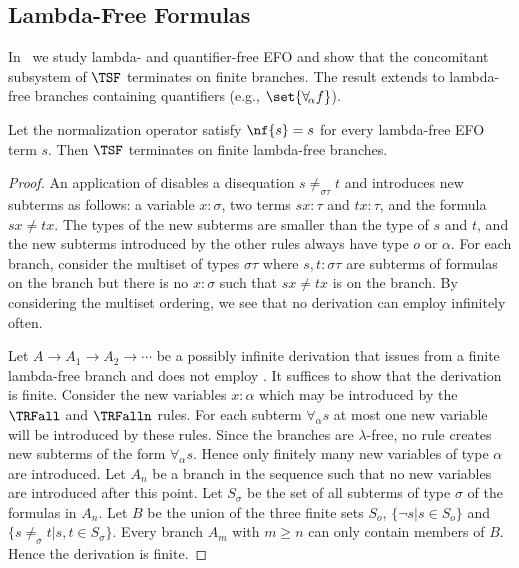 \subsection{Lambda-Free Formulas}

In~\cite{BrownSmolkaBasic} we study lambda- and
quantifier-free EFO and show that the concomitant
subsystem of $\TSF$ terminates on finite branches.  The
result extends to lambda-free branches containing
quantifiers (e.g., $\set{\forall_{\!\alpha} f}$).

\begin{prop}
  Let the normalization operator satisfy\lmcs{\linebreak}
  $\nf{s}=s$ for
  every lambda-free EFO term $s$.  Then $\TSF$
  terminates on finite lambda-free branches.
\end{prop}

\begin{proof}
  An application of \TRFFE disables a disequation
  $s{\neq_{\sigma\tau}}t$ and introduces new subterms
  as follows: a variable $x:\sigma$, two terms
  $sx:\tau$ and $tx:\tau$, and the formula $sx{\neq}tx$.  The types of the new
  subterms are smaller than the type of $s$ and $t$,
  and the new subterms introduced by the other rules
  always have type $o$ or $\alpha$.
  For each branch,
  consider the multiset of types
  $\sigma\tau$ where
  $s,t:\sigma\tau$ are subterms of formulas on the branch but
  there is no $x:\sigma$ such that
  $sx\neq tx$ is on the branch.
  By considering the multiset ordering, we see that no derivation can
  employ \TRFFE infinitely often.

  Let $A\to A_1\to A_2\to\cdots$ be a possibly infinite
  derivation that issues from a finite lambda-free
  branch and does not employ \TRFFE.  It suffices to
  show that the derivation is finite.  
  Consider the new variables $x:\alpha$ which may be introduced
  by the $\TRFall$ and $\TRFalln$ rules.
  For each subterm $\forall_{\!\alpha} s$ at most one new variable will
  be introduced by these rules.
  Since the branches are $\lambda$-free, no rule creates new subterms of the form $\forall_{\!\alpha} s$.
  Hence only finitely many new variables of type $\alpha$
  are introduced.
  Let $A_n$ be a branch in the sequence such that no new
  variables are introduced after this point.  
  Let $S_\sigma$ be the set of all subterms of type $\sigma$ of the formulas in $A_n$.
  Let $B$ be the union of the three finite sets 
  $S_o$, $\{\neg s | s\in S_o\}$
  and $\{s\not=_\sigma t | s,t\in S_\sigma\}$.
  Every branch $A_m$ with $m\geq n$
  can only contain members of $B$.  Hence the derivation is finite.
\end{proof}

